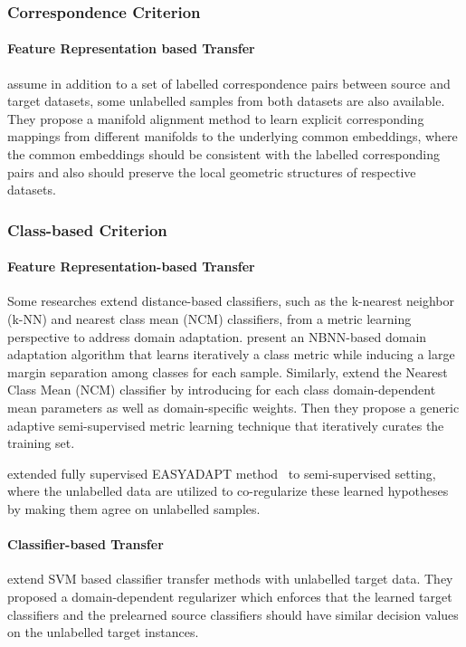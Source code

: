 \documentclass[prodmode]{acmsmall}  %
\begin{document}
\subsubsection{Correspondence Criterion}
\paragraph{Feature Representation based Transfer}
 assume in addition to a set of labelled correspondence pairs between source and target datasets, some unlabelled samples from both datasets are also available. They propose a manifold alignment method to learn explicit corresponding mappings from different manifolds to the underlying common embeddings, where the common embeddings should be consistent with the labelled corresponding pairs and also should preserve the local geometric structures of respective datasets.
\subsubsection{Class-based Criterion}
\paragraph{Feature Representation-based Transfer}
Some researches extend distance-based classifiers, such as the k-nearest neighbor (k-NN) and nearest class mean (NCM) classifiers, from a metric learning perspective to address domain adaptation.  present an NBNN-based domain adaptation algorithm that learns iteratively a class metric while inducing a large margin separation among classes for each sample. Similarly,  extend the Nearest Class Mean (NCM) classifier by introducing for each class domain-dependent mean parameters as well as domain-specific weights. Then they propose a generic adaptive semi-supervised metric learning technique that iteratively curates the training set.

 extended fully supervised EASYADAPT method~\cite{DaumeIII2007} to semi-supervised setting, where the unlabelled data are utilized to co-regularize these learned hypotheses by making them agree on unlabelled samples. 
\paragraph{Classifier-based Transfer}  extend SVM based classifier transfer methods with unlabelled target data. They proposed a domain-dependent regularizer which enforces that the learned target classifiers and the prelearned source classifiers should have similar decision values on the unlabelled target instances.
\end{document}
